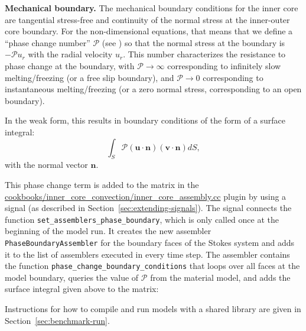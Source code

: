 \documentclass{article}
\begin{document}
\vspace{0.3cm}
\textbf{Mechanical boundary.}
The mechanical boundary conditions for the inner core are
tangential stress-free and continuity of the normal stress at the
inner-outer core boundary. For the non-dimensional equations, that
means that we define a ``phase change number'' $\mathcal{P}$ (see \cite{Deguen2013}) so that the
normal stress at the boundary is $-\mathcal{P} u_r$ with the radial velocity
$u_r$. This number characterizes the resistance to phase change at
the boundary, with $\mathcal{P}\rightarrow\infty$ corresponding to infinitely slow
melting/freezing (or a free slip boundary), and $\mathcal{P}\rightarrow0$ corresponding to
instantaneous melting/freezing (or a zero normal stress, corresponding to an open boundary).

In the weak form, this results in boundary conditions of the form
of a surface integral:
\begin{equation*}
\int_S \mathcal{P} (\mathbf u \cdot \mathbf n) (\mathbf v \cdot \mathbf n) dS,
\end{equation*}
with the normal vector $\mathbf n$.

This phase change term is added to the matrix in the 
\url{cookbooks/inner_core_convection/inner_core_assembly.cc} plugin by using a signal 
(as described in Section~\ref{sec:extending-signals}). The signal 
connects the function \verb!set_assemblers_phase_boundary!, which is only called once at the beginning of 
the model run. It creates the new assembler \texttt{PhaseBoundaryAssembler} for the boundary faces of the Stokes 
system and adds it to the list of assemblers executed in every time step. 
The assembler contains the function \verb!phase_change_boundary_conditions! that loops over all faces at the model 
boundary, queries the value of $\mathcal{P}$ from the material model, and adds the surface integral given above
to the matrix:

Instructions for how to compile and run models with a shared library are given in Section~\ref{sec:benchmark-run}.
\end{document}
